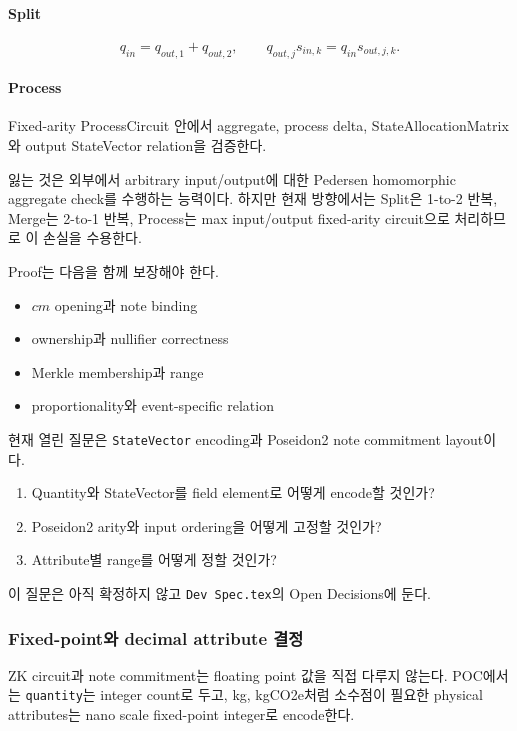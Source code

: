 \documentclass[11pt]{extarticle}
\begin{document}
\paragraph{Split}
\[
q_{in}=q_{out,1}+q_{out,2},
\qquad
q_{out,j}s_{in,k}=q_{in}s_{out,j,k}.
\]

\paragraph{Process}
Fixed-arity ProcessCircuit 안에서 aggregate, process delta, StateAllocationMatrix와
output StateVector relation을 검증한다.

잃는 것은 외부에서 arbitrary input/output에 대한 Pedersen homomorphic
aggregate check를 수행하는 능력이다. 하지만 현재 방향에서는 Split은
1-to-2 반복, Merge는 2-to-1 반복, Process는 max input/output fixed-arity
circuit으로 처리하므로 이 손실을 수용한다.

Proof는 다음을 함께 보장해야 한다.

\begin{itemize}
  \item $cm$ opening과 note binding
  \item ownership과 nullifier correctness
  \item Merkle membership과 range
  \item proportionality와 event-specific relation
\end{itemize}

현재 열린 질문은 \texttt{StateVector} encoding과 Poseidon2 note
commitment layout이다.

\begin{enumerate}
  \item Quantity와 StateVector를 field element로 어떻게 encode할 것인가?
  \item Poseidon2 arity와 input ordering을 어떻게 고정할 것인가?
  \item Attribute별 range를 어떻게 정할 것인가?
\end{enumerate}

이 질문은 아직 확정하지 않고
\texttt{Dev Spec.tex}의 Open Decisions에 둔다.

\subsubsection{Fixed-point와 decimal attribute
결정}\label{fixed-pointuxc640-decimal-attribute-uxacb0uxc815}

ZK circuit과 note commitment는 floating point 값을 직접 다루지 않는다.
POC에서는 \texttt{quantity}는 integer count로 두고, kg, kgCO2e처럼
소수점이 필요한 physical attributes는 nano scale fixed-point integer로
encode한다.
\end{document}
